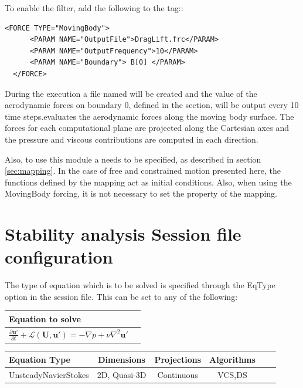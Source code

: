 To enable the filter, add the following to the  tag::

\begin{lstlisting}[style=XMLStyle]
  <FORCE TYPE="MovingBody">
      <PARAM NAME="OutputFile">DragLift.frc</PARAM>
      <PARAM NAME="OutputFrequency">10</PARAM>
      <PARAM NAME="Boundary"> B[0] </PARAM>
  </FORCE>
\end{lstlisting}

During the execution a file named  will be created and the
value of the aerodynamic forces on boundary 0, defined in the
 section, will be output every 10 time steps.evaluates the aerodynamic forces along the moving body surface. The
forces for each computational plane are projected along the Cartesian axes and the pressure and viscous contributions are computed in each direction.

Also, to use this module a  needs to be specified, as described in section \ref{sec:mapping}. In the case of free and constrained motion presented here, the functions defined by the mapping act as initial conditions. Also, when using the MovingBody forcing, it is not necessary to set the  property of the mapping. 

\section{Stability analysis Session file configuration}
\label{SecStabFile}
The type of equation which is to be solved is specified through the \inltt
{EqType} option in the session file. This can be set to any of the following:

\begin{center}
\footnotesize
\begin{tabular}{lc}
\toprule
{Equation to solve}  \\
\midrule
$\frac{\partial\mathbf{u'}}{\partial t} +\mathcal{L}(\mathbf{U},\mathbf{u'})=-\nabla p+\nu \nabla^2 \mathbf{u'}$\\
\bottomrule
\end{tabular}
\end{center}


\begin{center}
\footnotesize
\begin{tabular}{lccccc}
\toprule
{Equation Type} & {Dimensions} &{Projections} &{Algorithms} \\
\midrule
UnsteadyNavierStokes & 2D, Quasi-3D& Continuous &VCS,DS\\
\bottomrule
\end{tabular}
\end{center}

